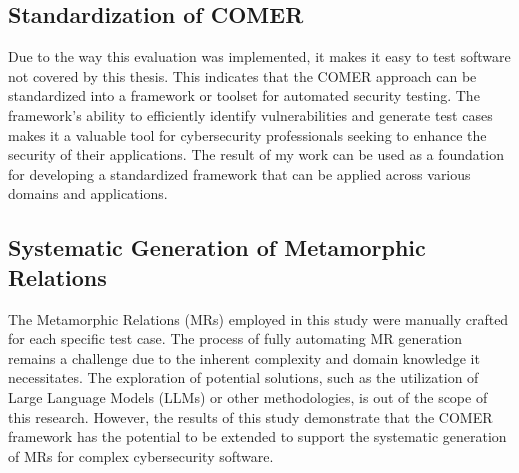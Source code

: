 \subsection{Standardization of COMER}

Due to the way this evaluation was implemented, it makes it easy to test software not covered by this thesis. This indicates that the COMER approach can be standardized into a framework or toolset for automated security testing. The framework's ability to efficiently identify vulnerabilities and generate test cases makes it a valuable tool for cybersecurity professionals seeking to enhance the security of their applications. The result of my work can be used as a foundation for developing a standardized framework that can be applied across various domains and applications.

\subsection{Systematic Generation of Metamorphic Relations}

The Metamorphic Relations (MRs) employed in this study were manually crafted for each specific test case. The process of fully automating MR generation remains a challenge due to the inherent complexity and domain knowledge it necessitates. The exploration of potential solutions, such as the utilization of Large Language Models (LLMs) or other methodologies, is out of the scope of this research. However, the results of this study demonstrate that the COMER framework has the potential to be extended to support the systematic generation of MRs for complex cybersecurity software.
